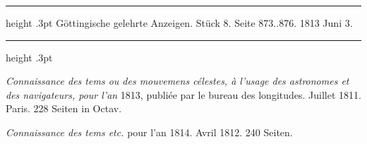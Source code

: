 \par\bigskip
\hypertarget{native-559-lower}{}\label{native-559-lower}
\begin{center}
\parbox{.76\linewidth}{%
\centering\small
\hrule height .3pt\relax\vspace{2.5pt}
Göttingische gelehrte Anzeigen. Stück 8. Seite 873..876. 1813 Juni 3.\par
\vspace{2.5pt}\hrule height .3pt\relax
}
\end{center}

\emph{Connaissance des tems ou des mouvemens célestes, à l'usage des astronomes et des navigateurs, pour l'an} 1813, publiée par le bureau des longitudes. Juillet 1811. Paris. 228 Seiten in Octav.

\emph{Connaissance des tems etc.} pour l'an 1814. Avril 1812. 240 Seiten.

